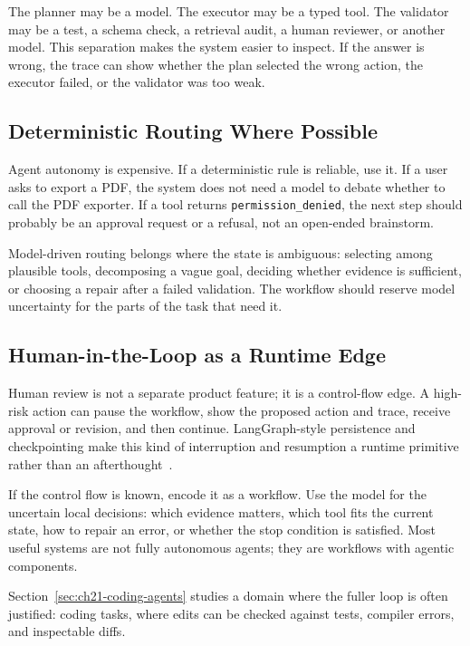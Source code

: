 The planner may be a model. The executor may be a typed tool. The validator may be a test, a schema check, a retrieval audit, a human reviewer, or another model. This separation makes the system easier to inspect. If the answer is wrong, the trace can show whether the plan selected the wrong action, the executor failed, or the validator was too weak.

\subsection{Deterministic Routing Where Possible}

Agent autonomy is expensive. If a deterministic rule is reliable, use it. If a user asks to export a PDF, the system does not need a model to debate whether to call the PDF exporter. If a tool returns \texttt{permission\_denied}, the next step should probably be an approval request or a refusal, not an open-ended brainstorm.

Model-driven routing belongs where the state is ambiguous: selecting among plausible tools, decomposing a vague goal, deciding whether evidence is sufficient, or choosing a repair after a failed validation. The workflow should reserve model uncertainty for the parts of the task that need it.

\subsection{Human-in-the-Loop as a Runtime Edge}

Human review is not a separate product feature; it is a control-flow edge. A high-risk action can pause the workflow, show the proposed action and trace, receive approval or revision, and then continue. LangGraph-style persistence and checkpointing make this kind of interruption and resumption a runtime primitive rather than an afterthought~\cite{langgraph2026persistence}.

\begin{tcolorbox}[colback=gray!8, colframe=gray!40, title=\textbf{Workflow First, Agent Where Needed}]
If the control flow is known, encode it as a workflow. Use the model for the uncertain local decisions: which evidence matters, which tool fits the current state, how to repair an error, or whether the stop condition is satisfied. Most useful systems are not fully autonomous agents; they are workflows with agentic components.
\end{tcolorbox}

Section~\ref{sec:ch21-coding-agents} studies a domain where the fuller loop is often justified: coding tasks, where edits can be checked against tests, compiler errors, and inspectable diffs.

